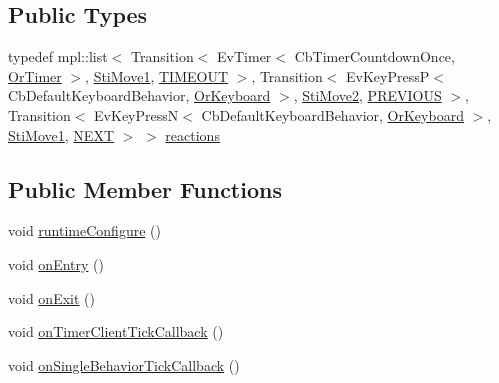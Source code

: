 \subsection*{Public Types}
\begin{DoxyCompactItemize}
\item 
typedef mpl\+::list$<$ Transition$<$ Ev\+Timer$<$ Cb\+Timer\+Countdown\+Once, \hyperlink{classsm__starcraft__ai_1_1OrTimer}{Or\+Timer} $>$, \hyperlink{structsm__starcraft__ai_1_1move__inner__states_1_1StiMove1}{Sti\+Move1}, \hyperlink{structsm__starcraft__ai_1_1move__inner__states_1_1StiMove3_1_1TIMEOUT}{T\+I\+M\+E\+O\+UT} $>$, Transition$<$ Ev\+Key\+PressP$<$ Cb\+Default\+Keyboard\+Behavior, \hyperlink{classsm__starcraft__ai_1_1OrKeyboard}{Or\+Keyboard} $>$, \hyperlink{structsm__starcraft__ai_1_1move__inner__states_1_1StiMove2}{Sti\+Move2}, \hyperlink{structsm__starcraft__ai_1_1move__inner__states_1_1StiMove3_1_1PREVIOUS}{P\+R\+E\+V\+I\+O\+US} $>$, Transition$<$ Ev\+Key\+PressN$<$ Cb\+Default\+Keyboard\+Behavior, \hyperlink{classsm__starcraft__ai_1_1OrKeyboard}{Or\+Keyboard} $>$, \hyperlink{structsm__starcraft__ai_1_1move__inner__states_1_1StiMove1}{Sti\+Move1}, \hyperlink{structsm__starcraft__ai_1_1move__inner__states_1_1StiMove3_1_1NEXT}{N\+E\+XT} $>$ $>$ \hyperlink{structsm__starcraft__ai_1_1move__inner__states_1_1StiMove3_a80a8cb4c25b8e2a44e50da48373cb72c}{reactions}
\end{DoxyCompactItemize}
\subsection*{Public Member Functions}
\begin{DoxyCompactItemize}
\item 
void \hyperlink{structsm__starcraft__ai_1_1move__inner__states_1_1StiMove3_ad32f89ed6e3b623f544aa84760247a21}{runtime\+Configure} ()
\item 
void \hyperlink{structsm__starcraft__ai_1_1move__inner__states_1_1StiMove3_a21bcffa9d10d3fbfc855a53664e2e833}{on\+Entry} ()
\item 
void \hyperlink{structsm__starcraft__ai_1_1move__inner__states_1_1StiMove3_a87ce076677f2a413212e302852780fa8}{on\+Exit} ()
\item 
void \hyperlink{structsm__starcraft__ai_1_1move__inner__states_1_1StiMove3_aae9ba9faf3d05bfb5353a6569a895b31}{on\+Timer\+Client\+Tick\+Callback} ()
\item 
void \hyperlink{structsm__starcraft__ai_1_1move__inner__states_1_1StiMove3_aa14b967f2718e5a6685966c8af317c93}{on\+Single\+Behavior\+Tick\+Callback} ()
\end{DoxyCompactItemize}
